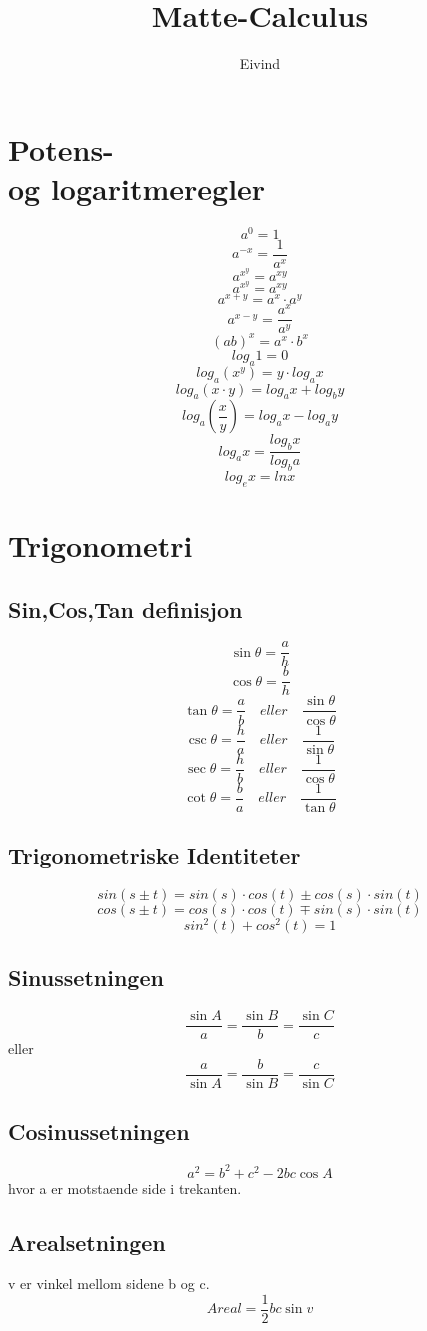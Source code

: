 \documentclass[12pt]{article}
\title{Matte-Calculus}
\author{Eivind}
\begin{document}
\section{Potens- \\og logaritmeregler}

\[a^0 = 1\]
\[a^{-x}=\frac{1}{a^{x}}\]
\[a^{x^y}=a^{xy}\]
\[a^{x^y}=a^{xy}\]
\[a^{x+y}=a^{x}\cdot a^{y}\]
\[a^{x-y}=\frac{a^{x}}{a^{y}}\]
\[(ab)^{x}= a^{x} \cdot b^{x}\]
\[log_{a} 1 = 0\]
\[log_{a} (x^{y}) = y\cdot log_{a}x\]
\[log_{a} (x\cdot y) = log_{a} x + log_{b} y\]
\[log_{a} (\frac{x}{y}) = log_{a} x -log_{a} y\]
\[log_{a} x =\frac{log_{b} x}{log_{b} a}\]
\[log_{e} x = ln x\]

\section{Trigonometri}
\subsection*{Sin,Cos,Tan definisjon}
\[\sin \theta = \frac{a}{h}\]
\[\cos \theta = \frac{b}{h}\]
\[\tan \theta = \frac{a}{b} \quad eller \quad \frac{\sin \theta}{\cos \theta}\]
\[\csc \theta = \frac{h}{a} \quad eller \quad \frac{1}{\sin \theta}\]
\[\sec \theta = \frac{h}{b} \quad eller \quad \frac{1}{\cos \theta}\]
\[\cot \theta = \frac{b}{a} \quad eller \quad \frac{1}{\tan \theta}\]
\subsection*{Trigonometriske \newline Identiteter}
\[sin (s\pm t) = sin(s) \cdot cos(t) \pm cos(s) \cdot sin(t) \]
\[cos (s\pm t) = cos(s) \cdot cos(t) \mp sin(s) \cdot sin(t) \]
\[sin^{2}(t) + cos^{2}(t) = 1\]
\subsection*{Sinussetningen}
\[\frac{\sin A}{a}=\frac{\sin B}{b}=\frac{\sin C}{c}\]
eller
\[\frac{a}{\sin A}=\frac{b}{\sin B}=\frac{c}{\sin C}\]
\subsection*{Cosinussetningen}
\[a^2=b^2+c^2-2bc\cos A\]
hvor a er motstaende side i trekanten.
\subsection*{Arealsetningen}
v er vinkel mellom sidene b og c.
\[Areal=\frac{1}{2}bc\sin v\]
\end{document}
